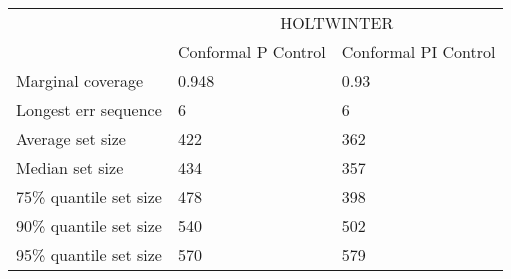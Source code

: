 \begin{tabular}{lll}
\toprule
& \multicolumn{2}{c}{HOLTWINTER} \\
& Conformal P Control & Conformal PI Control \\
\midrule
Marginal coverage & 0.948 & 0.93 \\
Longest err sequence & 6 & 6 \\
Average set size & 422 & 362 \\
Median set size & 434 & 357 \\
75\% quantile set size & 478 & 398 \\
90\% quantile set size & 540 & 502 \\
95\% quantile set size & 570 & 579 \\
\bottomrule
\end{tabular}
